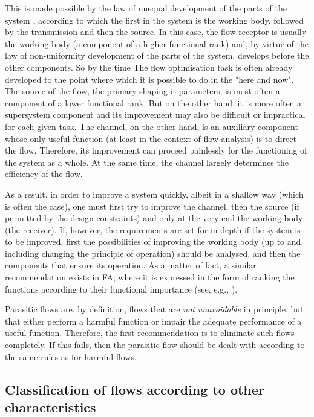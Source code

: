 \documentclass[a4paper,11pt]{article}
\begin{document}
This is made possible by the law of unequal development of the parts of the
system \cite{B6}, according to which the first in the system is the working
body, followed by the transmission and then the source. In this case, the flow
receptor is usually the working body (a component of a higher functional rank)
and, by virtue of the law of non-uniformity development of the parts of the
system, develops before the other components. So by the time The flow
optimisation task is often already developed to the point where which it is
possible to do in the "here and now". The source of the flow, the primary
shaping it parameters, is most often a component of a lower functional rank.
But on the other hand, it is more often a supersystem component and its
improvement may also be difficult or impractical for each given task. The
channel, on the other hand, is an auxiliary component whose only useful
function (at least in the context of flow analysis) is to direct the flow.
Therefore, its improvement can proceed painlessly for the functioning of the
system as a whole. At the same time, the channel largely determines the
efficiency of the flow.

As a result, in order to improve a system quickly, albeit in a shallow way
(which is often the case), one must first try to improve the channel, then the
source (if permitted by the design constraints) and only at the very end the
working body (the receiver). If, however, the requirements are set for
in-depth if the system is to be improved, first the possibilities of improving
the working body (up to and including changing the principle of operation)
should be analysed, and then the components that ensure its operation. As a
matter of fact, a similar recommendation exists in FA, where it is expressed
in the form of ranking the functions according to their functional importance
(see, e.g., \cite{B16}).

Parasitic flows are, by definition, flows that are \emph{not unavoidable} in
principle, but that either perform a harmful function or impair the adequate
performance of a useful function. Therefore, the first recommendation is to
eliminate such flows completely. If this fails, then the parasitic flow should
be dealt with according to the same rules as for harmful flows.

\subsection{Classification of flows according to other characteristics}
\end{document}
